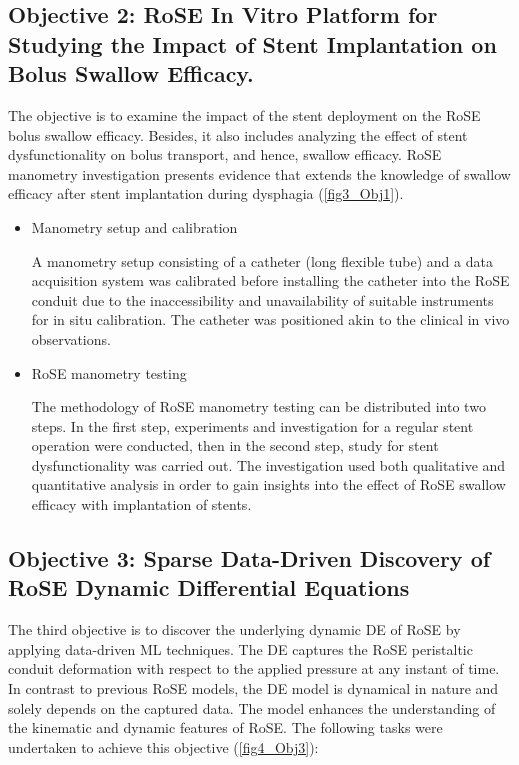 \subsection{Objective 2: RoSE In Vitro Platform for Studying the Impact of Stent Implantation on Bolus Swallow Efficacy.}

The objective is to examine the impact of the stent deployment on the \ac{RoSE} bolus swallow efficacy. Besides, it also includes analyzing the effect of stent dysfunctionality on bolus transport, and hence, swallow efficacy. \ac{RoSE} manometry investigation presents evidence that extends the knowledge of swallow efficacy after stent implantation during dysphagia (\autoref{fig3_Obj1}). 

\begin{itemize}
	\item Manometry setup and calibration
	
	A manometry setup consisting of a catheter (long flexible tube) and a data acquisition system was calibrated before installing the catheter into the \ac{RoSE} conduit due to the inaccessibility and unavailability of suitable instruments for in situ calibration. The catheter was positioned akin to the clinical in vivo observations.  
	
	\item RoSE manometry testing
	
	The methodology of \ac{RoSE} manometry testing can be distributed into two steps. In the first step, experiments and investigation for a regular stent operation were conducted, then in the second step, study for stent dysfunctionality was carried out. The investigation used both qualitative and quantitative analysis in order to gain insights into the effect of \ac{RoSE} swallow efficacy with implantation of stents. 
\end{itemize}
\subsection{Objective 3: Sparse Data-Driven Discovery of RoSE Dynamic Differential Equations}

The third objective is to discover the underlying dynamic \ac{DE} of \ac{RoSE}
by applying data-driven ML techniques. The \ac{DE} captures the \ac{RoSE}
peristaltic conduit deformation with respect to the applied pressure at
any instant of time. In contrast to previous \ac{RoSE} models, the \ac{DE} model
is dynamical in nature and solely depends on the captured data. The
model enhances the understanding of the kinematic and dynamic
features of \ac{RoSE}. The following tasks were undertaken to achieve this
objective (\autoref{fig4_Obj3}):

